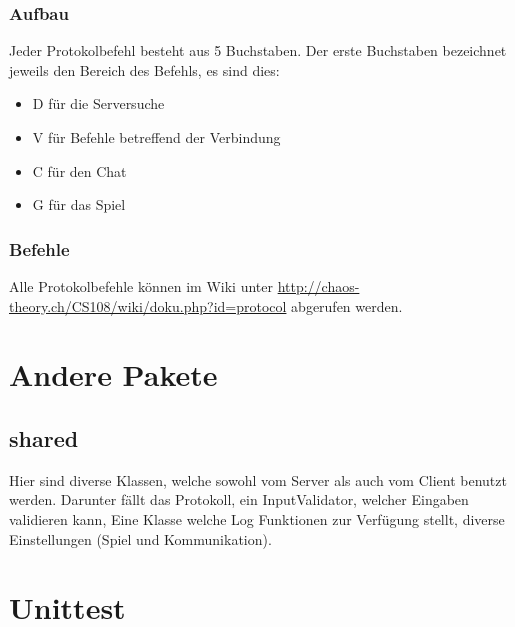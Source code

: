 \documentclass[ngerman, 12pt, pdftex]{scrartcl}[2006/07/30]
\begin{document}
\subsubsection{Aufbau}
Jeder Protokolbefehl besteht aus 5 Buchstaben. Der erste Buchstaben bezeichnet jeweils den Bereich des Befehls, es sind dies:
\begin{itemize}
\item D für die Serversuche
\item V für Befehle betreffend der Verbindung
\item C für den Chat
\item G für das Spiel
\end{itemize}
\subsubsection{Befehle}
Alle Protokolbefehle können im Wiki unter \url{http://chaos-theory.ch/CS108/wiki/doku.php?id=protocol} abgerufen werden.

\section{Andere Pakete}
\subsection{shared}
Hier sind diverse Klassen, welche sowohl vom Server als auch vom Client benutzt werden.
Darunter fällt das Protokoll, ein InputValidator, welcher Eingaben validieren kann, Eine Klasse welche Log Funktionen zur Verfügung stellt,
diverse Einstellungen (Spiel und Kommunikation).

\section{Unittest}

\end{document}
